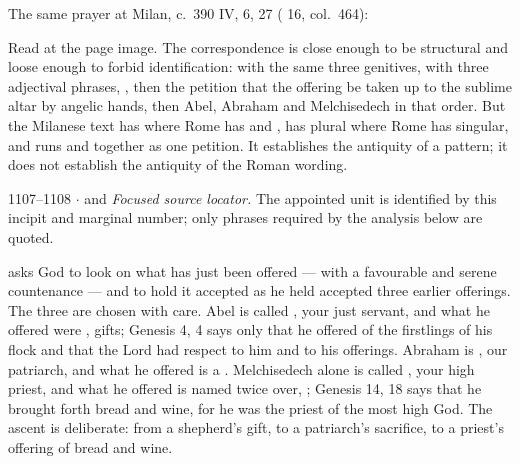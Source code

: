 \begin{witnesscard}{The same prayer at Milan, c.~390}
 IV, 6, 27 ( 16, col.~464): \par
\vspace{0.3em}
Read at the page image. The correspondence is close enough to be structural and
loose enough to forbid identification:  with the same three
genitives,  with three adjectival phrases, , then the petition that the offering be taken up to the
sublime altar by angelic hands, then Abel, Abraham and Melchisedech in that
order. But the Milanese text has  where Rome has
 and , has  plural where Rome has  singular,
and runs  and  together as one
petition. It establishes the antiquity of a pattern; it does not establish the
antiquity of the Roman wording.
\end{witnesscard}

\begin{appointed}{1107--1108 $\cdot$  and }
\textit{Focused source locator.} The appointed unit is identified by this incipit and marginal number; only phrases required by the analysis below are quoted.
\end{appointed}

 asks God to look on what has just been offered
 --- with a favourable and serene
countenance --- and to hold it accepted as he held accepted three earlier
offerings. The three are chosen with care. Abel is called , your just servant, and what he offered were , gifts;
Genesis 4, 4 says only that he offered of the firstlings of his flock and that
the Lord had respect to him and to his offerings. Abraham is
, our patriarch, and what he offered is a
. Melchisedech alone is called , your high priest, and what he offered is named twice over,
; Genesis 14, 18 says that
he brought forth bread and wine, for he was the priest of the most high God.
The ascent is deliberate: from a shepherd's gift, to a patriarch's sacrifice, to
a priest's offering of bread and wine.


